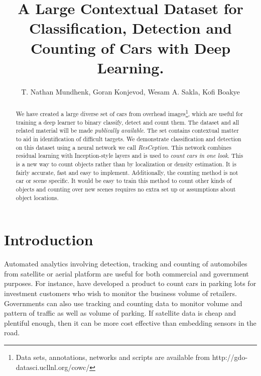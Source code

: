 \documentclass[runningheads]{llncs}
\begin{document}
\pagestyle{headings}
\mainmatter

\title{A Large Contextual Dataset for Classification, Detection and Counting of Cars with Deep Learning.} 



\author{T. Nathan Mundhenk, Goran Konjevod, Wesam A. Sakla, Kofi Boakye}





\maketitle


\begin{abstract}
We have created a large diverse set of cars from overhead images\footnote{Data sets, annotations, networks and scripts are available from http://gdo-datasci.ucllnl.org/cowc/}, which are useful for training a deep learner to binary classify, detect and count them. The dataset and all related material will be made {\it publically available}. The set contains contextual matter to aid in identification of difficult targets. We demonstrate classification and detection on this dataset using a neural network we call {\it ResCeption}. This network combines residual learning with Inception-style layers and is used to {\it count cars in one look}. This is a new way to count objects rather than by localization or density estimation. It is fairly accurate, fast and easy to implement. Additionally, the counting method is not car or scene specific. It would be easy to train this method to count other kinds of objects and counting over new scenes requires no extra set up or assumptions about object locations. 
\end{abstract}

\section{Introduction}
Automated analytics involving detection, tracking and counting of automobiles from satellite or aerial platform are useful for both commercial and government purposes. For instance, \cite{OrbitalInsight16} have developed a product to count cars in parking lots for investment customers who wish to monitor the business volume of retailers. Governments can also use tracking and counting data to monitor volume and pattern of traffic as well as volume of parking. If satellite data is cheap and plentiful enough, then it can be more cost effective than embedding sensors in the road. 
\end{document}
